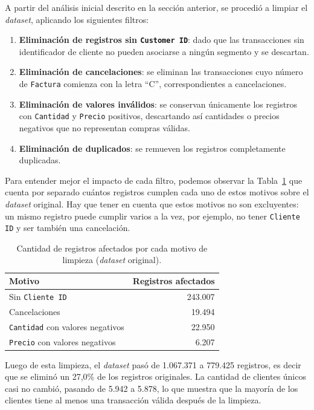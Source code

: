\documentclass[a4paper,10pts,openany]{book}
\begin{document}
	A partir del análisis inicial descrito en la sección anterior, se procedió a limpiar el \emph{dataset}, aplicando los siguientes filtros:
	
	\begin{enumerate}
		\item \textbf{Eliminación de registros sin \texttt{Customer ID}}: dado que las transacciones sin identificador de cliente no pueden asociarse a ningún segmento y se descartan. \item \textbf{Eliminación de cancelaciones}: se eliminan las transacciones cuyo número de \texttt{Factura} comienza con la letra ``C'', correspondientes a cancelaciones.
		\item \textbf{Eliminación de valores inválidos}: se conservan únicamente los registros con \texttt{Cantidad} y \texttt{Precio} positivos, descartando así cantidades o precios negativos que no representan compras válidas.
		\item \textbf{Eliminación de duplicados}: se remueven los registros completamente duplicadas.
	\end{enumerate}
	
	Para entender mejor el impacto de cada filtro, podemos observar la Tabla~\ref{tab:motivos_limpieza} que cuenta por separado cuántos registros cumplen cada uno de estos motivos sobre el \emph{dataset} original. Hay que tener en cuenta que estos motivos no son excluyentes: un mismo registro puede cumplir varios a la vez, por ejemplo, no tener \texttt{Cliente ID} y ser también una cancelación.
	
	\begin{table}[H]
		\centering
		\caption{Cantidad de registros afectados por cada motivo de limpieza (\emph{dataset} original).}
		\label{tab:motivos_limpieza}
		
		\begin{tabular}{lr}
			\toprule
			Motivo & Registros afectados \\
			\midrule
			Sin \texttt{Cliente ID} & 243.007 \\
			Cancelaciones & 19.494 \\
			\texttt{Cantidad} con valores negativos & 22.950 \\
			\texttt{Precio} con valores negativos & 6.207 \\
			\bottomrule
		\end{tabular}
	\end{table}
	
	Luego de esta limpieza, el \emph{dataset} pasó de 1.067.371 a 779.425 registros, es decir que se eliminó un 27{,}0\% de los registros originales. La cantidad de clientes únicos casi no cambió, pasando de 5.942 a 5.878, lo que muestra que la mayoría de los clientes tiene al menos una transacción válida después de la limpieza.
	
\end{document}
